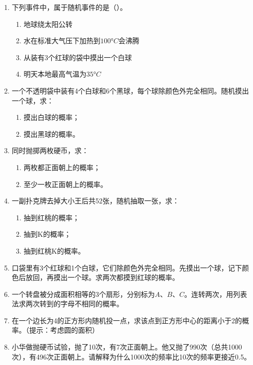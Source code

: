 \documentclass[12pt, a4paper]{ctexart}
\begin{document}
\begin{enumerate}[label=\textbf{\arabic*.}, leftmargin=2em]
  \item 下列事件中，属于随机事件的是（\quad）。
  \begin{enumerate}[label=A.]
    \item 地球绕太阳公转
    \item 水在标准大气压下加热到$100°C$会沸腾
    \item 从装有3个红球的袋中摸出一个白球
    \item 明天本地最高气温为$35°C$
  \end{enumerate}

  \item 一个不透明袋中装有4个白球和6个黑球，每个球除颜色外完全相同。随机摸出一个球，求：
  \begin{enumerate}[label=(\arabic*)]
    \item 摸出白球的概率；
    \item 摸出黑球的概率。
  \end{enumerate}

  \item 同时抛掷两枚硬币，求：
  \begin{enumerate}[label=(\arabic*)]
    \item 两枚都正面朝上的概率；
    \item 至少一枚正面朝上的概率。
  \end{enumerate}

  \item 一副扑克牌去掉大小王后共52张，随机抽取一张，求：
  \begin{enumerate}[label=(\arabic*)]
    \item 抽到红桃的概率；
    \item 抽到K的概率；
    \item 抽到红桃K的概率。
  \end{enumerate}

  \item 口袋里有3个红球和1个白球，它们除颜色外完全相同。先摸出一个球，记下颜色后放回，再摸出一个球。求两次都摸到红球的概率。

  \item 一个转盘被分成面积相等的3个扇形，分别标为$A$、$B$、$C$。连转两次，用列表法求两次转到的字母不相同的概率。

  \item 在一个边长为4的正方形内随机投一点，求该点到正方形中心的距离小于2的概率。（提示：考虑圆的面积）

  \item 小华做抛硬币试验，抛了10次，有7次正面朝上。他又抛了990次（总共1000次），有496次正面朝上。请解释为什么1000次的频率比10次的频率更接近0.5。
\end{enumerate}
\end{document}
